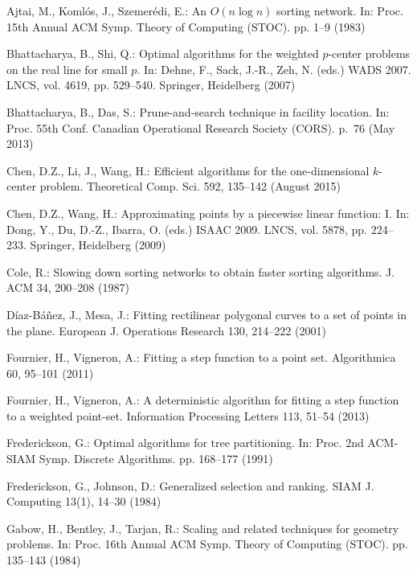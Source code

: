 \documentclass[preprint,10pt]{elsarticle}
\begin{document}
\begin{thebibliography}{10}
\providecommand{\url}[1]{\texttt{#1}}
\providecommand{\urlprefix}{URL }

Ajtai, M., Koml\'{o}s, J., Szemer\'{e}di, E.: An ${O}(n \log n)$ sorting
  network. In: Proc. 15th Annual ACM Symp. Theory of Computing (STOC). pp. 1--9
  (1983)

Bhattacharya, B., Shi, Q.: Optimal algorithms for the weighted $p$-center
  problems on the real line for small $p$. In: Dehne, F., Sack, J.-R., Zeh, N. (eds.)
  WADS 2007. LNCS, vol. 4619, pp. 529--540. Springer, Heidelberg (2007)

Bhattacharya, B., Das, S.: Prune-and-search technique in facility location. In:
  Proc. 55th Conf. Canadian Operational Research Society (CORS). p.~76 (May
  2013)

Chen, D.Z., Li, J., Wang, H.: Efficient algorithms for the one-dimensional
  $k$-center problem. Theoretical Comp. Sci.  592,  135--142 (August 2015)

Chen, D.Z., Wang, H.: Approximating points by a piecewise linear function: I.
In: Dong, Y., Du, D.-Z., Ibarra, O. (eds.) ISAAC 2009. LNCS, vol. 5878,
pp. 224--233. Springer, Heidelberg (2009)

Cole, R.: Slowing down sorting networks to obtain faster sorting algorithms. J.
  ACM  34,  200--208 (1987)

{D\'{i}az-B\'{a}\~{n}ez}, J., Mesa, J.: Fitting rectilinear polygonal curves to
  a set of points in the plane. European J. Operations Research  130,  214--222
  (2001)

Fournier, H., Vigneron, A.: Fitting a step function to a point set.
  Algorithmica  60,  95--101 (2011)

Fournier, H., Vigneron, A.: A deterministic algorithm for fitting a step
  function to a weighted point-set. Information Processing Letters  113,
  51--54 (2013)

Frederickson, G.: Optimal algorithms for tree partitioning. In: Proc. 2nd
  ACM-SIAM Symp. Discrete Algorithms. pp. 168--177 (1991)

Frederickson, G., Johnson, D.: Generalized selection and ranking. SIAM J.
  Computing  13(1),  14--30 (1984)

Gabow, H., Bentley, J., Tarjan, R.: Scaling and related techniques for geometry
  problems. In: Proc. 16th Annual ACM Symp. Theory of Computing (STOC). pp.
  135--143 (1984)


\end{thebibliography}
\end{document}
